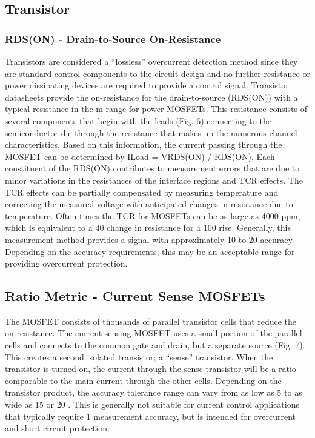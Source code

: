 \documentclass[12pt,a4paper,titlepage,openany]{report}
\begin{document}
\subsection{Transistor}
\subsubsection{RDS(ON) - Drain-to-Source On-Resistance}
Transistors are considered a “lossless” overcurrent detection method since they are standard control components to the circuit
design and no further resistance or power dissipating devices are required to provide a control signal. Transistor datasheets
provide the on-resistance for the drain-to-source (RDS(ON)) with a typical resistance in the m range for power MOSFETs. This
resistance consists of several components that begin with the leads (Fig. 6) connecting to the semiconductor die through the
resistance that makes up the numerous channel characteristics. Based on this information, the current passing through the
MOSFET can be determined by ILoad = VRDS(ON) / RDS(ON).
Each constituent of the RDS(ON) contributes to measurement errors that are due to minor variations in the resistances of the
interface regions and TCR effects. The TCR effects can be partially compensated by measuring temperature and correcting the
measured voltage with anticipated changes in resistance due to temperature. Often times the TCR for MOSFETs can be as large
as 4000 ppm, which is equivalent to a 40  change in resistance for a 100  rise. Generally, this measurement method
provides a signal with approximately 10  to 20  accuracy. Depending on the accuracy requirements, this may be an
acceptable range for providing overcurrent protection.

\subsection{Ratio Metric - Current Sense MOSFETs}
The MOSFET consists of thousands of parallel transistor cells that reduce the on-resistance. The current sensing MOSFET uses
a small portion of the parallel cells and connects to the common gate and drain, but a separate source (Fig. 7). This creates a
second isolated transistor; a “sense” transistor. When the transistor is turned on, the current through the sense transistor will
be a ratio comparable to the main current through the other cells.
Depending on the transistor product, the accuracy tolerance range can vary from as low as 5  to as wide as 15  or 20 .
This is generally not suitable for current control applications that typically require 1  measurement accuracy, but is intended
for overcurrent and short circuit protection.
\end{document}

